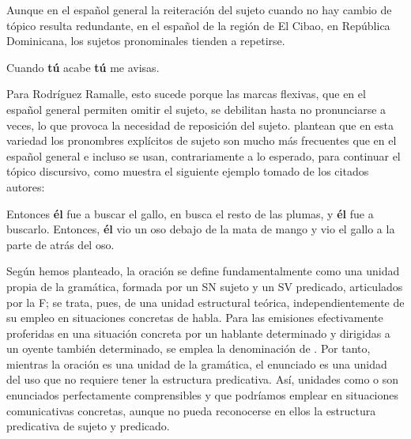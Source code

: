\begin{recuadro}
Aunque en el español general la reiteración del sujeto cuando no hay cambio de
tópico resulta redundante, en el español de la región de El Cibao, en República
Dominicana, los sujetos pronominales tienden a repetirse.

\begin{exe}
  \ex Cuando \textbf{tú} acabe \textbf{tú} me avisas.
      \parencite[ejemplo tomado de][393]{rodriguezramalle2005}
\end{exe}

Para Rodríguez Ramalle, esto sucede porque las marcas flexivas, que en el
español general permiten omitir el sujeto, se debilitan hasta no pronunciarse a
veces, lo que provoca la necesidad de reposición del sujeto.
\textcite{bullock2009} plantean que en esta variedad los pronombres explícitos de
sujeto son mucho más frecuentes que en el español general e incluso se usan,
contrariamente a lo esperado, para continuar el tópico discursivo, como muestra
el siguiente ejemplo tomado de los citados autores:

\begin{exe}
  \ex Entonces \textbf{él} fue a buscar el gallo, en busca el resto de las
      plumas, y \textbf{él} fue a buscarlo. Entonces, \textbf{él} vio un oso
      debajo de la mata de mango y vio el gallo a la parte de atrás del oso.
      \parencite[56; hablante dominicano de El Cibao]{bullock2009}
\end{exe}
\end{recuadro}

\begin{recuadro}
Según hemos planteado, la oración se define fundamentalmente como una unidad
propia de la gramática, formada por un SN sujeto y un SV predicado, articulados
por la F; se trata, pues, de una unidad estructural teórica, independientemente
de su empleo en situaciones concretas de habla. Para las emisiones efectivamente
proferidas en una situación concreta por un hablante determinado y dirigidas a
un oyente también determinado, se emplea la denominación de
. Por tanto, mientras la oración es una unidad de la
gramática, el enunciado es una unidad del uso que no requiere tener la
estructura predicativa. Así, unidades como  o  son enunciados perfectamente comprensibles y
que podríamos emplear en situaciones comunicativas concretas, aunque no pueda
reconocerse en ellos la estructura predicativa de sujeto y predicado.
\end{recuadro}


